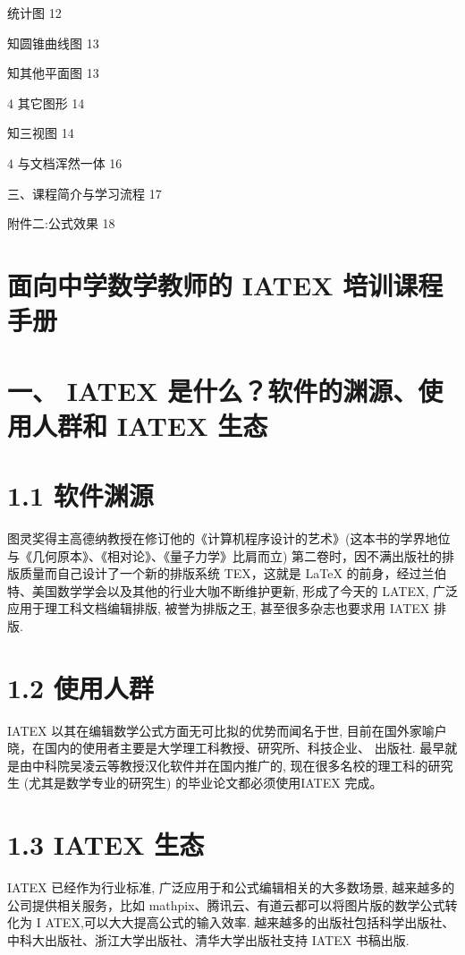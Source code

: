 \documentclass[10pt]{article}
\begin{document}
统计图 12

知圆锥曲线图 13

知其他平面图 13

4 其它图形 14

知三视图 14

4 与文档浑然一体 16

三、课程简介与学习流程 17

附件二:公式效果 18

\section*{面向中学数学教师的 IATEX 培训课程手册}

\section*{一、 IATEX 是什么？软件的渊源、使用人群和 IATEX 生态}

\section*{1.1 软件渊源}

图灵奖得主高德纳教授在修订他的《计算机程序设计的艺术》(这本书的学界地位与《几何原本》、《相对论》、《量子力学》比肩而立) 第二卷时，因不满出版社的排版质量而自己设计了一个新的排版系统 TEX，这就是 LaTeX 的前身，经过兰伯特、美国数学学会以及其他的行业大咖不断维护更新, 形成了今天的 LATEX, 广泛应用于理工科文档编辑排版, 被誉为排版之王, 甚至很多杂志也要求用 IATEX 排版.

\section*{1.2 使用人群}

IATEX 以其在编辑数学公式方面无可比拟的优势而闻名于世, 目前在国外家喻户晓，在国内的使用者主要是大学理工科教授、研究所、科技企业、 出版社. 最早就是由中科院吴凌云等教授汉化软件并在国内推广的, 现在很多名校的理工科的研究生 (尤其是数学专业的研究生) 的毕业论文都必须使用IATEX 完成。

\section*{1.3 IATEX 生态}

IATEX 已经作为行业标准, 广泛应用于和公式编辑相关的大多数场景, 越来越多的公司提供相关服务，比如 mathpix、腾讯云、有道云都可以将图片版的数学公式转化为 \(\mathrm{I}\) ATEX,可以大大提高公式的输入效率. 越来越多的出版社包括科学出版社、中科大出版社、浙江大学出版社、清华大学出版社支持 IATEX 书稿出版.
\end{document}
